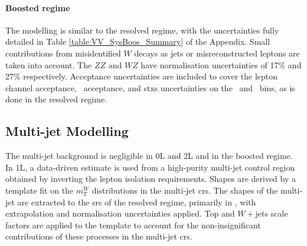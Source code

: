 \paragraph{Boosted regime} The modelling is similar to the resolved regime, with the uncertainties fully detailed in Table \ref{table:VV_SysBoos_Summary} of the Appendix. Small contributions from misidentified $W$ decays as jets or misreconstructed leptons are taken into account. The $ZZ$ and $WZ$ have normalisation uncertainties of 17\% and 27\% respectively. Acceptance uncertainties are included to cover the lepton channel acceptance, \ptv\ acceptance, and \gls{stxs} uncertainties on the \ptv\ and \nj\ bins, as is done in the resolved regime.

\subsection{Multi-jet Modelling}\label{sec-modMultiJ} 
The multi-jet background is negligible in 0L and 2L and in the boosted regime. In 1L, a data-driven estimate is used from a high-purity multi-jet control region obtained by inverting the lepton isolation requirements. Shapes are derived by a template fit on the $m_T^W$ distributions in the multi-jet \glspl{cr}. The shapes of the multi-jet are extracted to the \glspl{sr} of the resolved regime, primarily in \vhc, with extrapolation and normalisation uncertainties applied. Top and $W+$jets scale factors are applied to the template to account for the non-insignificant contributions of these processes in the multi-jet \glspl{cr}.